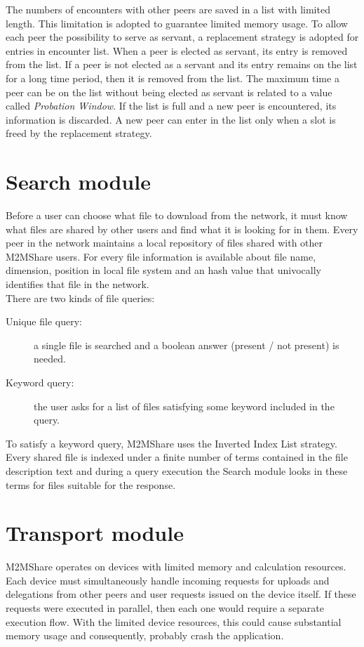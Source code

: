 The numbers of encounters with other peers are saved in a list with limited length. This limitation is adopted to guarantee limited memory usage. To allow each peer the possibility to serve as servant, a replacement strategy is adopted for entries in encounter list. When a peer is elected as servant, its entry is removed from the list. If a peer is not elected as a servant and its entry remains on the list for a long time period, then it is removed from the list. The maximum time a peer can be on the list without being elected as servant is related to a value called \textit{Probation Window}. If the list is full and a new peer is encountered, its information is discarded. A new peer can enter in the list only when a slot is freed by the replacement strategy.

\section{Search module}
Before a user can choose what file to download from the network, it must know what files are shared by other users and find what it is looking for in them. Every peer in the network maintains a local repository of files shared with other M2MShare users. For every file information is available about file name, dimension, position in local file system and an hash value that univocally identifies that file in the network.
\\

There are two kinds of file queries: 

\begin{description}
\item[Unique file query:] a single file is searched and a boolean answer (present / not present) is needed.
\item[Keyword query:] the user asks for a list of files satisfying some keyword included in the query.
\end{description}

To satisfy a keyword query, M2MShare uses the Inverted Index List strategy. Every shared file is indexed under a finite number of terms contained in the file description text and during a query execution the Search module looks in these terms for files suitable for the response.


\section{Transport module}
M2MShare operates on devices with limited memory and calculation resources. Each device must simultaneously handle incoming requests for uploads and delegations from other peers and user requests issued on the device itself. If these requests were executed in parallel, then each one would require a separate execution flow. With the limited device resources, this could cause substantial memory usage and consequently, probably crash the application.
\\

